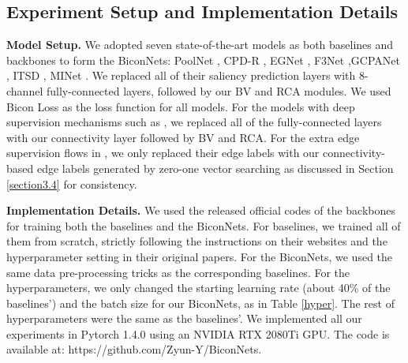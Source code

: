 \documentclass[review]{cvpr}
\begin{document}

\subsection{Experiment Setup and Implementation Details}
\textbf{Model Setup.} We adopted seven state-of-the-art models as both baselines and backbones to form the BiconNets: PoolNet \cite{poolnet}, CPD-R \cite{cpd}, EGNet \cite{egnet}, F3Net \cite{f3net} ,GCPANet \cite{gcpa}, ITSD \cite{ITSD}, MINet \cite{MINet}. We replaced all of their saliency prediction layers with 8-channel fully-connected layers, followed by our BV and RCA modules. We used Bicon Loss as the loss function for all models. For the models with deep supervision mechanisms such as \cite{egnet,gcpa}, we replaced all of the fully-connected layers with our connectivity layer followed by BV and RCA. For the extra edge supervision flows in \cite{egnet,ITSD}, we only replaced their edge labels with our connectivity-based edge labels generated by zero-one vector searching as discussed in Section \ref{section3.4} for consistency.

\textbf{Implementation Details.} We used the released official codes of the backbones for training both the baselines and the BiconNets. For baselines, we trained all of them from scratch, strictly following the instructions on their websites and the hyperparameter setting in their original papers. For the BiconNets, we used the same data pre-processing tricks as the corresponding baselines. For the hyperparameters, we only changed the starting learning rate (about 40\% of the baselines') and the batch size for our BiconNets, as in Table \ref{hyper}. The rest of hyperparameters were the same as the baselines’. We implemented all our experiments in Pytorch 1.4.0 \cite{pytorch} using an NVIDIA RTX 2080Ti GPU. The code is available at: https://github.com/Zyun-Y/BiconNets.
\end{document}
